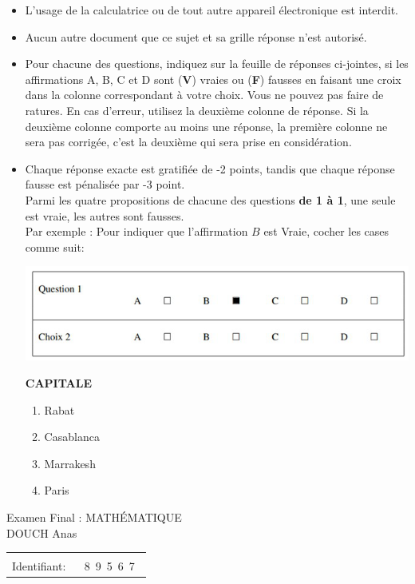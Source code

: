\documentclass{book}%
\begin{document}
\begin{itemize}%
\item%
L'usage de la calculatrice ou de tout autre appareil électronique est interdit.%
\item%
Aucun autre document que ce sujet et sa grille réponse n'est autorisé.%
\item%
Pour chacune des questions, indiquez sur la feuille de réponses ci-jointes, si les affirmations A, B, C et D sont (\textbf{V}) vraies ou (\textbf{F}) fausses en faisant une croix dans la colonne correspondant à votre choix. Vous ne pouvez pas faire de ratures. En cas d'erreur, utilisez la deuxième colonne de réponse. Si la deuxième colonne comporte au moins une réponse, la première colonne ne sera pas corrigée, c'est la deuxième qui sera prise en considération.%
\item%
Chaque réponse exacte est gratifiée de -2 points, tandis que chaque réponse fausse est pénalisée par -3 point. \\ 	Parmi les quatre propositions de chacune des questions \textbf{de 1 à 1}, une seule est vraie, les autres sont fausses. \\ 	Par exemple : Pour indiquer que l'affirmation $B$ est Vraie, cocher les cases comme suit:  \\ \begin{center}	\includegraphics[scale=0.8]{reponses.png} \end{center}%
\thispagestyle{empty}%
\begin{exercise}%
\textbf{CAPITALE }%
\begin{enumerate}[label=\textbf{\Alph*. }]%
\item%
Rabat%
\item%
Casablanca%
\item%
Marrakesh%
\item%
Paris%
\end{enumerate}%
\end{exercise}%
\end{itemize}%
\newpage%
\thispagestyle{empty}%
Examen Final : MATHÉMATIQUE $\qquad \qquad \qquad \qquad \qquad \qquad \qquad \qquad$ DOUCH Anas%
\begin{flushright}%
\begin{tabular}{|l|}%
\hline%
 \\%
\thispagestyle{empty}%
Identifiant: $\quad$ {\Large 8~9~5~6~7~}%
 \\%
\hline%
\end{tabular}%
\end{flushright}%
\end{document}
